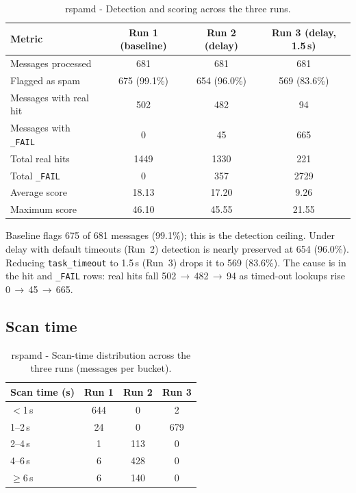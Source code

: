 \begin{table}[H]\centering
\small
\begin{tabular}{@{}lccc@{}}
\toprule
Metric & Run 1 (baseline) & Run 2 (delay) & Run 3 (delay, 1.5\,s) \\
\midrule
Messages processed            & 681 & 681 & 681 \\
Flagged as spam               & 675 (99.1\%) & 654 (96.0\%) & 569 (83.6\%) \\
Messages with real hit        & 502 & 482 & 94 \\
Messages with \texttt{\_FAIL} & 0 & 45 & 665 \\
Total real hits               & 1449 & 1330 & 221 \\
Total \texttt{\_FAIL}         & 0 & 357 & 2729 \\
Average score                 & 18.13 & 17.20 & 9.26 \\
Maximum score                 & 46.10 & 45.55 & 21.55 \\
\bottomrule
\end{tabular}
\caption{rspamd - Detection and scoring across the three runs.}
\label{tab:rspamd-detection}
\end{table}

Baseline flags 675 of 681 messages (99.1\%); this is the detection ceiling.
Under delay with default timeouts (Run~2) detection is nearly preserved at 654
(96.0\%). Reducing \texttt{task\_timeout} to 1.5\,s (Run~3) drops it to 569
(83.6\%). The cause is in the hit and \texttt{\_FAIL} rows: real hits fall
502\,$\to$\,482\,$\to$\,94 as timed-out lookups rise 0\,$\to$\,45\,$\to$\,665.


\subsection{Scan time}

\begin{table}[H]\centering
\small
\begin{tabular}{@{}lccc@{}}
\toprule
Scan time (s) & Run 1 & Run 2 & Run 3 \\
\midrule
$<$1\,s   & 644 & 0   & 2 \\
1--2\,s   & 24  & 0   & 679 \\
2--4\,s   & 1   & 113 & 0 \\
4--6\,s   & 6   & 428 & 0 \\
$\geq$6\,s & 6  & 140 & 0 \\
\bottomrule
\end{tabular}
\caption{rspamd - Scan-time distribution across the three runs (messages per bucket).}
\label{tab:rspamd-scan}
\end{table}

